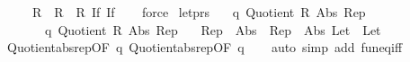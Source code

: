 \begin{isabellebody}
\ \ \ {\isachardoublequoteopen}{\isacharparenleft}{\kern0pt}{\isacharparenleft}{\kern0pt}{\isacharequal}{\kern0pt}{\isacharparenright}{\kern0pt}\ {\isacharequal}{\kern0pt}{\isacharequal}{\kern0pt}{\isacharequal}{\kern0pt}{\isachargreater}{\kern0pt}\ R\ {\isacharequal}{\kern0pt}{\isacharequal}{\kern0pt}{\isacharequal}{\kern0pt}{\isachargreater}{\kern0pt}\ R\ {\isacharequal}{\kern0pt}{\isacharequal}{\kern0pt}{\isacharequal}{\kern0pt}{\isachargreater}{\kern0pt}\ R{\isacharparenright}{\kern0pt}\ If\ If{\isachardoublequoteclose}\isanewline
%
\isadelimproof
\ \ %
\endisadelimproof
%
\isatagproof
{}\isamarkupfalse%
\ force%
\endisatagproof
{\isafoldproof}%
%
\isadelimproof
\isanewline
%
\endisadelimproof
\isanewline
{}\isamarkupfalse%
\ let{\isacharunderscore}{\kern0pt}prs{\isacharcolon}{\kern0pt}\isanewline
\ \ \ q{}{\isacharcolon}{\kern0pt}\ {\isachardoublequoteopen}Quotient{}\ R{}\ Abs{}\ Rep{}{\isachardoublequoteclose}\isanewline
\ \ \ \ \ \ \ q{}{\isacharcolon}{\kern0pt}\ {\isachardoublequoteopen}Quotient{}\ R{}\ Abs{}\ Rep{}{\isachardoublequoteclose}\isanewline
\ \ \ {\isachardoublequoteopen}{\isacharparenleft}{\kern0pt}Rep{}\ {\isacharminus}{\kern0pt}{\isacharminus}{\kern0pt}{\isacharminus}{\kern0pt}{\isachargreater}{\kern0pt}\ {\isacharparenleft}{\kern0pt}Abs{}\ {\isacharminus}{\kern0pt}{\isacharminus}{\kern0pt}{\isacharminus}{\kern0pt}{\isachargreater}{\kern0pt}\ Rep{}{\isacharparenright}{\kern0pt}\ {\isacharminus}{\kern0pt}{\isacharminus}{\kern0pt}{\isacharminus}{\kern0pt}{\isachargreater}{\kern0pt}\ Abs{}{\isacharparenright}{\kern0pt}\ Let\ {\isacharequal}{\kern0pt}\ Let{\isachardoublequoteclose}\isanewline
%
\isadelimproof
\ \ %
\endisadelimproof
%
\isatagproof
{}\isamarkupfalse%
\ Quotient{}{\isacharunderscore}{\kern0pt}abs{\isacharunderscore}{\kern0pt}rep{\isacharbrackleft}{\kern0pt}OF\ q{}{\isacharbrackright}{\kern0pt}\ Quotient{}{\isacharunderscore}{\kern0pt}abs{\isacharunderscore}{\kern0pt}rep{\isacharbrackleft}{\kern0pt}OF\ q{}{\isacharbrackright}{\kern0pt}\isanewline
\ \ \isamarkupfalse%
\ {\isacharparenleft}{\kern0pt}auto\ simp\ add{\isacharcolon}{\kern0pt}\ fun{\isacharunderscore}{\kern0pt}eq{\isacharunderscore}{\kern0pt}iff{\isacharparenright}{\kern0pt}%
\endisatagproof
{\isafoldproof}%
%
\isadelimproof

\end{isabellebody}

